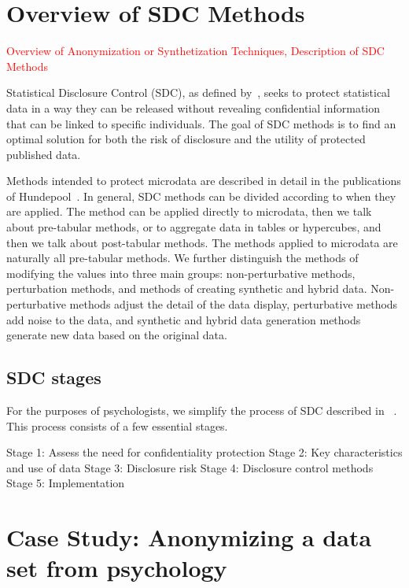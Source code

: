 \documentclass{article}
\begin{document}
\section{Overview of SDC Methods}

\textcolor{red}{Overview of Anonymization or Synthetization Techniques, Description of SDC Methods}


Statistical Disclosure Control (SDC), as defined by~\cite{2012_Hundepool}, seeks to protect statistical data in a way they can be released without revealing confidential information that can be linked to specific individuals. The goal of SDC methods is to find an optimal solution for both the risk of disclosure and the utility of protected published data.

Methods intended to protect microdata are described in detail in the publications of Hundepool~\cite{2012_Hundepool}. In general, SDC methods can be divided according to when they are applied. The method can be applied directly to microdata, then we talk about pre-tabular methods, or to aggregate data in tables or hypercubes, and then we talk about post-tabular methods. The methods applied to microdata are naturally all pre-tabular methods.
We further distinguish the methods of modifying the values into three main groups: non-perturbative methods, perturbation methods, and methods of creating synthetic and hybrid data. Non-perturbative methods adjust the detail of the data display, perturbative methods add noise to the data, and synthetic and hybrid data generation methods generate new data based on the original data. 
\newline


\subsection{SDC stages}

For the purposes of psychologists, we simplify the process of SDC described in ~\cite{2012_Hundepool}.
This process consists of a few essential stages.

Stage 1: Assess the need for confidentiality protection
Stage 2: Key characteristics and use of data
Stage 3: Disclosure risk
Stage 4: Disclosure control methods
Stage 5: Implementation

\section{Case Study: Anonymizing a data set from psychology}
\end{document}
